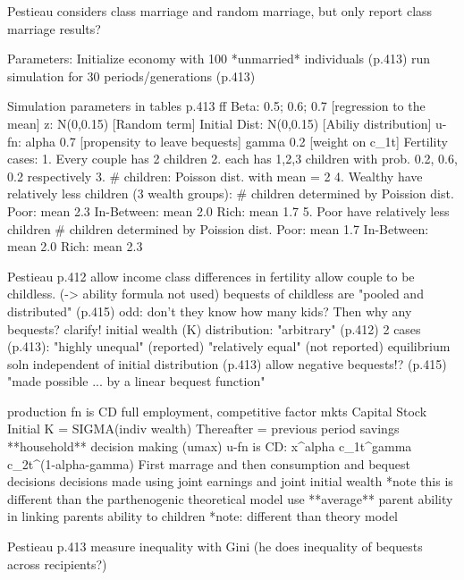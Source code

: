 \documentclass{article}
\begin{document}
Pestieau considers class marriage and random marriage, but only report class marriage results?

\begin{verbatimtab}
Parameters:
	Initialize economy with 100 *unmarried* individuals (p.413)
	run simulation for 30 periods/generations (p.413)

Simulation parameters in tables p.413 ff
	Beta:			0.5; 0.6; 0.7	[regression to the mean]
	z: 				N(0,0.15)		[Random term]
	Initial Dist:	N(0,0.15)		[Abiliy distribution]
	u-fn:	alpha	0.7				[propensity to leave bequests]
			gamma	0.2				[weight on c_1t]
	Fertility cases:
		1. Every couple has 2 children
		2. each has 1,2,3 children with prob. 0.2, 0.6, 0.2 respectively
		3. # children: Poisson dist. with mean = 2
		4. Wealthy have relatively less children (3 wealth groups):
			# children determined by Poission dist.
			Poor: 		mean 2.3
			In-Between: mean 2.0
			Rich:		mean 1.7
		5. Poor have relatively less children
			# children determined by Poission dist.
			Poor:		mean 1.7
			In-Between:	mean 2.0
			Rich:		mean 2.3
\end{verbatimtab}

\begin{verbatimtab}[4]
Pestieau p.412
	allow income class differences in fertility
	allow couple to be childless. (-> ability formula not used)
		bequests of childless are "pooled and distributed" (p.415)
		odd: don't they know how many kids? Then why any bequests? clarify!
	initial wealth (K) distribution:
		"arbitrary" (p.412)
		2 cases (p.413):
			"highly unequal" (reported)
			"relatively equal" (not reported)
			equilibrium soln independent of initial distribution (p.413)
	allow negative bequests!? (p.415)
		"made possible ... by a linear bequest function"
			
	production fn is CD
	full employment, competitive factor mkts
	Capital Stock
		Initial K = SIGMA(indiv wealth)
		Thereafter = previous period savings
	**household** decision making (umax)
		u-fn is CD: x^alpha c_{1}t^gamma c_{2}t^(1-alpha-gamma)
	First marrage and then consumption and bequest decisions
		decisions made using joint earnings and joint initial wealth
			*note this is different than the parthenogenic theoretical model
	use **average** parent ability in linking parents ability to children
		*note: different than theory model
	
Pestieau p.413
	measure inequality with Gini (he does inequality of bequests across recipients?)

\end{verbatimtab}
\end{document}
